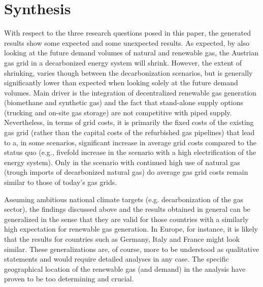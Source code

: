 \section{Synthesis}\label{synthesis}
With respect to the three research questions posed in this paper, the generated results show some expected and some unexpected results. As expected, by also looking at the future demand volumes of natural and renewable gas, the Austrian gas grid in a decarbonized energy system will shrink. However, the extent of shrinking, varies though between the decarbonization scenarios, but is generally significantly lower than expected when looking solely at the future demand volumes. Main driver is the integration of decentralized renewable gas generation (biomethane and synthetic gas) and the fact that stand-alone supply options (trucking and on-site gas storage) are not competitive with piped supply. Nevertheless, in terms of grid costs, it is primarily the fixed costs of the existing gas grid (rather than the capital costs of the refurbished gas pipelines) that lead to a, in some scenarios, significant increase in average grid costs compared to the status quo (e.g., fivefold increase in the scenario with a high electrification of the energy system). Only in the scenario with continued high use of natural gas (trough imports of decarbonized natural gas) do average gas grid costs remain similar to those of today's gas grids.\vspace{0.3cm}

Assuming ambitious national climate targets (e.g. decarbonization of the gas sector), the findings discussed above and the results obtained in general can be generalized in the sense that they are valid for those countries with a similarly high expectation for renewable gas generation. In Europe, for instance, it is likely that the results for countries such as Germany, Italy and France might look similar. These generalizations are, of course, more to be understood as qualitative statements and would require detailed analyses in any case. The specific geographical location of the renewable gas (and demand) in the analysis have proven to be too determining and crucial.\vspace{0.3cm}

